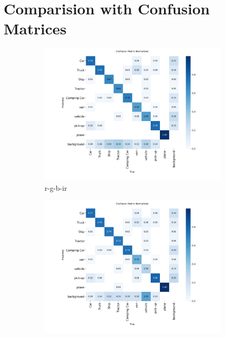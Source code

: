 \section{Comparision with Confusion Matrices}
\begin{figure}[h] 
    \centering
    \begin{subfigure}[b]{0.85\textwidth} %
        \includegraphics[width=\textwidth]{images/confusion_matrices/rgbir_F4_confusion_matrix_normalized.png} %
        \caption{r-g-b-ir} %
        \label{fig:cm_rgbir} %
    \end{subfigure}
    \hfill %
    \begin{subfigure}[b]{0.85\textwidth} %
        \includegraphics[width=\textwidth]{images/confusion_matrices/irgb_F4_confusion_matrix_normalized.png} %

\end{subfigure}
\end{figure}
